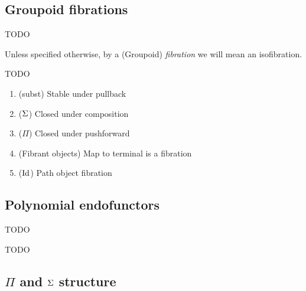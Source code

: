 \medskip

\subsection{Groupoid fibrations}

\begin{defn}[Isofibration]
  TODO

  Unless specified otherwise,
  by a (Groupoid) \textit{fibration} we will mean an isofibration.
\end{defn}

\begin{prop}
  TODO
  \begin{enumerate}
    \item (\textsf{subst}) Stable under pullback
    \item ($\Sigma$) Closed under composition
    \item ($\Pi$) Closed under pushforward
    \item (Fibrant objects) Map to terminal is a fibration
    \item ($\mathrm{Id}$) Path object fibration
  \end{enumerate}
\end{prop}

\medskip

\subsection{Polynomial endofunctors}

\begin{defn}
  TODO
\end{defn}

\medskip

\begin{prop}
  TODO
\end{prop}

\medskip

\subsection{$\Pi$ and $\Sigma$ structure}

\medskip

